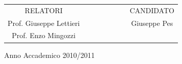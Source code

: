 \begin{titlepage}
\vskip 2cm
  \begin{center}
    \begin{tabular}{c c c c c c c c}
      RELATORI  & & & & & & & CANDIDATO \\
      \large{Prof. Giuseppe Lettieri}   & & & & & & & \large{Giuseppe Pes}\\
      \large{Prof. Enzo Mingozzi} 
    \end{tabular}
  \end{center}

\vskip 1cm
\begin{center}
{\normalsize Anno Accademico 2010/2011}
\end{center}
\end{titlepage}
\clearpage{\pagestyle{empty}\cleardoublepage}
